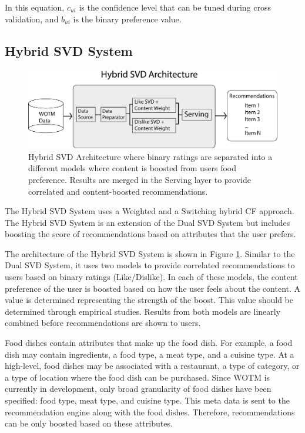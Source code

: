 In this equation, \begin{math} c_{ui} \end{math} is the confidence level that can be tuned during cross validation, and \begin{math} b_{ui} \end{math} is the binary preference value. 

\subsection{Hybrid SVD System}

\begin{figure}
\centering
\includegraphics[scale=0.5]{recent_images/Hybrid_ALS_architecture.png}
\caption{Hybrid SVD Architecture where binary ratings are separated into a different models where content is boosted from users food preference. Results are merged in the Serving layer to provide correlated and content-boosted recommendations.}
\label{fig:hybrid_architecture}
\end{figure}

The Hybrid SVD System uses a Weighted \cite{spiegel2010hybrid} and a Switching \cite{spiegel2010hybrid} hybrid CF approach. The Hybrid SVD System is an extension of the Dual SVD System but includes boosting the score of recommendations based on attributes that the user prefers. 

The architecture of the Hybrid SVD System is shown in Figure \ref{fig:hybrid_architecture}. Similar to the Dual SVD System, it uses two models to provide correlated recommendations to users based on binary ratings (Like/Dislike). In each of these models, the content preference of the user is boosted based on how the user feels about the content. A value is determined representing the strength of the boost. This value should be determined through empirical studies. Results from both models are linearly combined before recommendations are shown to users. 

Food dishes contain attributes that make up the food dish. For example, a food dish may contain ingredients, a food type, a meat type, and a cuisine type. At a high-level, food dishes may be associated with a restaurant, a type of category, or a type of location where the food dish can be purchased. Since WOTM is currently in development, only broad granularity of food dishes have been specified: food type, meat type, and cuisine type. This meta data is sent to the recommendation engine along with the food dishes. Therefore, recommendations can be only boosted based on these attributes. 

